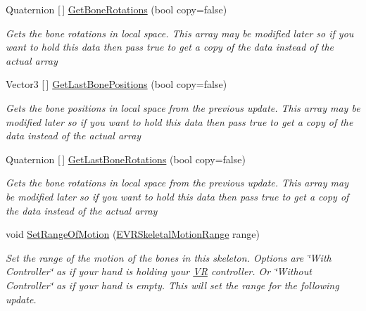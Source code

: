 \begin{DoxyCompactItemize}
Quaternion \mbox{[}$\,$\mbox{]} \mbox{\hyperlink{class_valve_1_1_v_r_1_1_steam_v_r___action___skeleton_ab195a41d6c0787b46d94ed089b42294b}{Get\+Bone\+Rotations}} (bool copy=false)
\begin{DoxyCompactList}\small\item\em Gets the bone rotations in local space. This array may be modified later so if you want to hold this data then pass true to get a copy of the data instead of the actual array \end{DoxyCompactList}\item 
Vector3 \mbox{[}$\,$\mbox{]} \mbox{\hyperlink{class_valve_1_1_v_r_1_1_steam_v_r___action___skeleton_ae34c92f9b61bc5556917b739bcef0e32}{Get\+Last\+Bone\+Positions}} (bool copy=false)
\begin{DoxyCompactList}\small\item\em Gets the bone positions in local space from the previous update. This array may be modified later so if you want to hold this data then pass true to get a copy of the data instead of the actual array \end{DoxyCompactList}\item 
Quaternion \mbox{[}$\,$\mbox{]} \mbox{\hyperlink{class_valve_1_1_v_r_1_1_steam_v_r___action___skeleton_a35816d947506cb60a58cd58cf5b49025}{Get\+Last\+Bone\+Rotations}} (bool copy=false)
\begin{DoxyCompactList}\small\item\em Gets the bone rotations in local space from the previous update. This array may be modified later so if you want to hold this data then pass true to get a copy of the data instead of the actual array \end{DoxyCompactList}\item 
void \mbox{\hyperlink{class_valve_1_1_v_r_1_1_steam_v_r___action___skeleton_a41593a6cf089c0c458a710653db92bdc}{Set\+Range\+Of\+Motion}} (\mbox{\hyperlink{namespace_valve_1_1_v_r_affc8d18345f8f5d36f1ae7b4ce534500}{E\+V\+R\+Skeletal\+Motion\+Range}} range)
\begin{DoxyCompactList}\small\item\em Set the range of the motion of the bones in this skeleton. Options are \char`\"{}\+With Controller\char`\"{} as if your hand is holding your \mbox{\hyperlink{namespace_valve_1_1_v_r}{VR}} controller. Or \char`\"{}\+Without Controller\char`\"{} as if your hand is empty. This will set the range for the following update. \end{DoxyCompactList}\item 

\end{DoxyCompactItemize}
